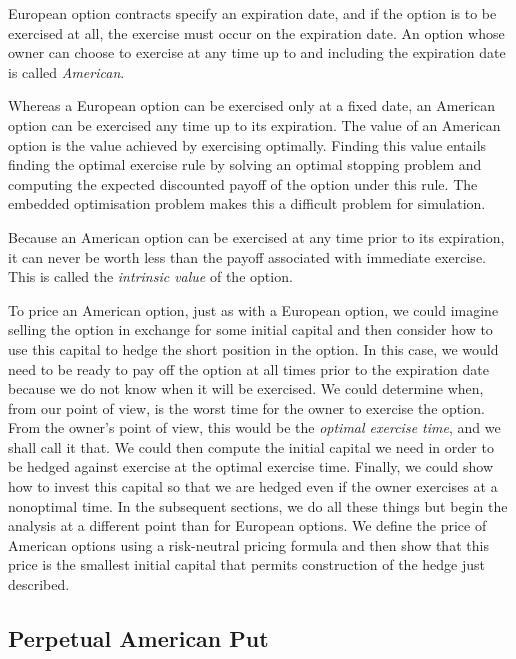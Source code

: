European option contracts specify an expiration date, and if the option is to be exercised at all, the exercise must occur on the expiration date. An option whose owner can choose to exercise at any time up to and including the expiration date is called \textit{American}.

Whereas a European option can be exercised only at a fixed date, an American option can be exercised any time up to its expiration. The value of an American option is the value achieved by exercising optimally. Finding this value entails finding the optimal exercise rule by solving an optimal stopping problem and computing the expected discounted payoff of the option under this rule. The embedded optimisation problem makes this a difficult problem for simulation.

Because an American option can be exercised at any time prior to its expiration, it can never be worth less than the payoff associated with immediate exercise. This is called the \textit{intrinsic value} of the option.

To price an American option, just as with a European option, we could imagine selling the option in exchange for some initial capital and then consider how to use this capital to hedge the short position in the option. In this case, we would need to be ready to pay off the option at all times prior to the expiration date because we do not know when it will be exercised. We could determine when, from our point of view, is the worst time for the owner to exercise the option. From the owner's point of view, this would be the \textit{optimal exercise time}, and we shall call it that. We could then compute the initial capital we need in order to be hedged against exercise at the optimal exercise time. Finally, we could show how to invest this capital so that we are hedged even if the owner exercises at a nonoptimal time. In the subsequent sections, we do all these things but begin the analysis at a different point than for European options. We define the price of American options using a risk-neutral pricing formula and then show that this price is the smallest initial capital that permits construction of the hedge just described.

\subsection{Perpetual American Put}

